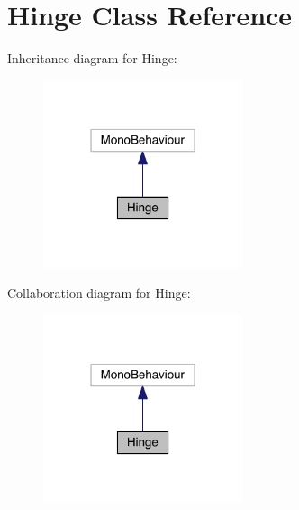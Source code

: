 \hypertarget{class_hinge}{}\section{Hinge Class Reference}
\label{class_hinge}


Inheritance diagram for Hinge\+:\nopagebreak
\begin{figure}[H]
\begin{center}
\leavevmode
\includegraphics[width=166pt]{class_hinge__inherit__graph}
\end{center}
\end{figure}


Collaboration diagram for Hinge\+:\nopagebreak
\begin{figure}[H]
\begin{center}
\leavevmode
\includegraphics[width=166pt]{class_hinge__coll__graph}
\end{center}
\end{figure}
